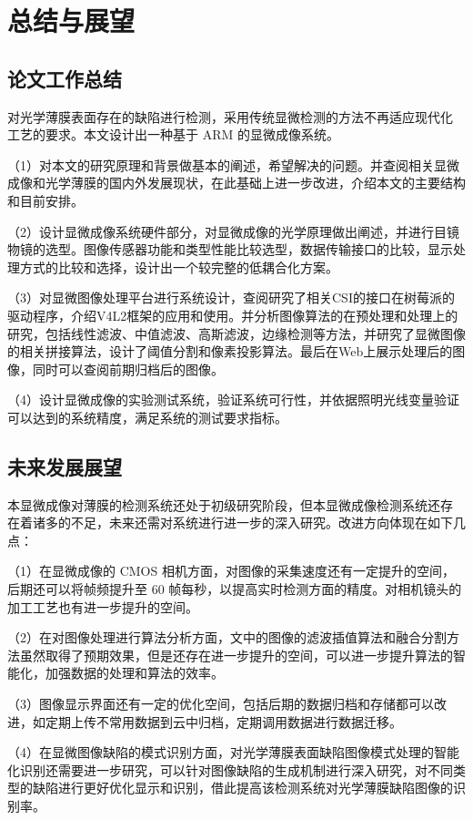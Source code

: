 \chapter{总结与展望}
\section{论文工作总结}
对光学薄膜表面存在的缺陷进行检测，采用传统显微检测的方法不再适应现代化 工艺的要求。本文设计出一种基于 ARM 的显微成像系统。

（1）对本文的研究原理和背景做基本的阐述，希望解决的问题。并查阅相关显微成像和光学薄膜的国内外发展现状，在此基础上进一步改进，介绍本文的主要结构和目前安排。

（2）设计显微成像系统硬件部分，对显微成像的光学原理做出阐述，并进行目镜物镜的选型。图像传感器功能和类型性能比较选型，数据传输接口的比较，显示处理方式的比较和选择，设计出一个较完整的低耦合化方案。

（3）对显微图像处理平台进行系统设计，查阅研究了相关CSI的接口在树莓派的驱动程序，介绍V4L2框架的应用和使用。并分析图像算法的在预处理和处理上的研究，包括线性滤波、中值滤波、高斯滤波，边缘检测等方法，并研究了显微图像的相关拼接算法，设计了阈值分割和像素投影算法。最后在Web上展示处理后的图像，同时可以查阅前期归档后的图像。

（4）设计显微成像的实验测试系统，验证系统可行性，并依据照明光线变量验证可以达到的系统精度，满足系统的测试要求指标。


\section{未来发展展望}
本显微成像对薄膜的检测系统还处于初级研究阶段，但本显微成像检测系统还存 在着诸多的不足，未来还需对系统进行进一步的深入研究。改进方向体现在如下几点： 

（1）在显微成像的 CMOS 相机方面，对图像的采集速度还有一定提升的空间， 后期还可以将帧频提升至 60 帧每秒，以提高实时检测方面的精度。对相机镜头的加工工艺也有进一步提升的空间。

（2）在对图像处理进行算法分析方面，文中的图像的滤波插值算法和融合分割方法虽然取得了预期效果，但是还存在进一步提升的空间，可以进一步提升算法的智能化，加强数据的处理和算法的效率。

（3）图像显示界面还有一定的优化空间，包括后期的数据归档和存储都可以改进，如定期上传不常用数据到云中归档，定期调用数据进行数据迁移。

（4）在显微图像缺陷的模式识别方面，对光学薄膜表面缺陷图像模式处理的智能化识别还需要进一步研究，可以针对图像缺陷的生成机制进行深入研究，对不同类型的缺陷进行更好优化显示和识别，借此提高该检测系统对光学薄膜缺陷图像的识别率。 



